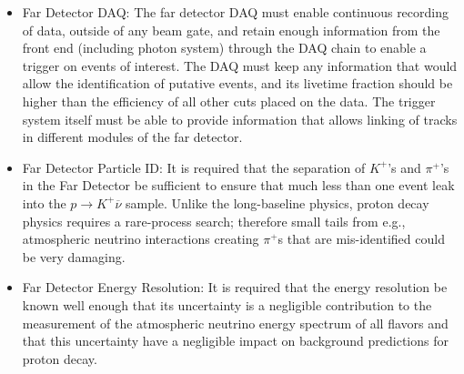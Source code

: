 \begin{itemize}

\item Far Detector DAQ: The far detector DAQ must enable continuous recording 
of data, outside of any beam gate, and retain enough
  information from the front end (including photon system) 
  through the DAQ chain to enable a trigger on events of interest. The DAQ must keep any
  information that would allow the identification of putative events, 
  and its livetime fraction should be higher than the
  efficiency of all other cuts placed on the data.  The trigger system
  itself must be able to provide information that allows linking of
  tracks in different modules of the far detector.


\item Far Detector Particle ID: It is required that the separation
  of $K^+$'s and $\pi^+$'s in the Far Detector be sufficient to ensure that
  much less than one event leak into the %
  $p\to K^+\overline{\nu}$ sample.  Unlike the
  long-baseline physics, proton decay physics requires a rare-process search;
  therefore small tails from e.g., atmospheric neutrino
  interactions creating $\pi^+$s that are mis-identified could be very
  damaging.

\item Far Detector Energy Resolution: It is required that the energy
  resolution be known well enough that its uncertainty is a negligible
  contribution to the measurement of the atmospheric neutrino energy
  spectrum of all flavors and that this uncertainty have a negligible impact on
  background predictions for proton decay.

\end{itemize}

